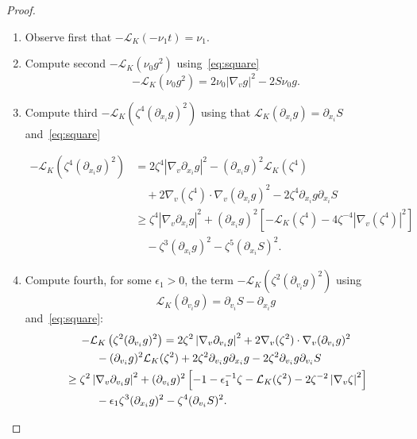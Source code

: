 \documentclass[10pt]{amsart}
\theoremstyle{definition}\newtheorem{defi}[theo]{Definition}\newtheorem{rema}[theo]{Remark}\newtheorem{exam}[theo]{Example}\newtheorem{exem}[theo]{Example}\newtheorem{nota}[theo]{Notation}
\newcommand{\cL}{\mathcal{L}}
\newcommand*{\romanenumi}{\renewcommand*{\theenumi}{\roman{enumi}}}
\begin{document}
\begin{proof}
\begin{enumerate}\romanenumi
\item \label{proofprop3.1.i} Observe first that $-\cL_K (-\nu_1t) = \nu_1$.

\item \label{proofprop3.1.ii} Compute second $-\cL_K (\nu_0 g^2)$ using~\eqref{eq:square}
\begin{equation}\label{eq:mu}
- \cL_K(\nu_0 g^2) = 2\nu_0 |\nabla_v g|^2 - 2 S \nu_0 g.
\end{equation}

\item \label{proofprop3.1.iii}Compute third $- \cL_K(\zeta^4 (\partial_{x_i}g)^2)$ using that $\mathcal L_K(\partial_{x_i}g)=\partial_{x_i}S$ and~\eqref{eq:square}

\begin{equation}\label{eq:zeta}
\begin{aligned}
- \cL_K\left(\zeta^4(\partial_{x_i}g)^2\right) & = 2 \zeta^4 \left|\nabla_v\partial_{x_i}g\right|^2 - (\partial_{x_i}g)^2 \cL_K \left(\zeta^4\right)
\\
& \quad + 2 \nabla_v (\zeta^4) \cdot
\nabla_v (\partial_{x_i} g)^2 - 2 \zeta^4 \partial_{x_i}g
\partial_{x_i}S \\
& \ge \zeta^4 \left|\nabla_v
\partial_{x_i}g\right|^2 + (\partial_{x_i}g)^2
\left[- \cL_K (\zeta^4) - 4 \zeta^{-4} \left|\nabla_v (\zeta^4)\right|^2 \right] \\
& \quad - \zeta^3 (\partial_{x_i}g)^2 - \zeta^5 (\partial_{x_i}S)^2.
\end{aligned}
\end{equation}

\item \label{proofprop3.1.iv}Compute fourth, for some $\epsilon_1>0$, the term $- \cL_K(\zeta^2(\partial_{v_i}g)^2)$ using
\[
\cL_K (\partial_{v_i} g) = \partial_{v_i}S -
\partial_{x_i}g
\]
and~\eqref{eq:square}:
\begin{multline}\label{eq:barbarzeta}
- \cL_K\left(\zeta^2 (\partial_{v_i}g)^2\right)
 = 2 \zeta^2 \left|\nabla_v \partial_{v_i} g\right|^2 + 2 \nabla_v (\zeta^2) \cdot \nabla_v (\partial_{v_i} g)^2 \\
\begin{aligned}
& \mkern50mu- (\partial_{v_i} g)^2 \cL_K (\zeta^2) + 2 \zeta^2
\partial_{v_i} g \partial_{x_i} g -2 \zeta^2 \partial_{v_i}g \partial_{v_i} S \\
& \ge \zeta^2 \left|\nabla_v \partial_{v_i} g\right|^2 + (\partial_{v_i} g)^2 \left[- 1 -
\epsilon_1 ^{-1} \zeta -
\cL_K (\zeta^2) - 2 \zeta^{-2} \left|\nabla_v
\zeta\right|^2\right] \\
& \mkern50mu - \epsilon_1 \zeta^3 (\partial_{x_i}g)^2 - \zeta^4 (\partial_{v_i} S)^2.
\end{aligned}
\end{multline}


\end{enumerate}
\end{proof}
\end{document}
